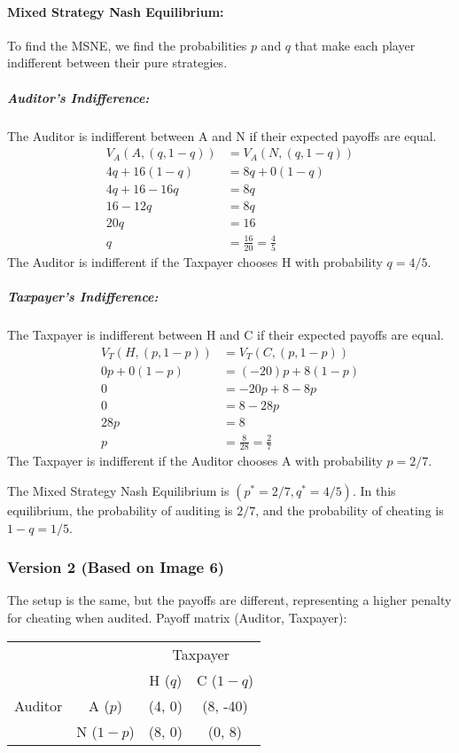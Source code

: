 \documentclass{article}
\begin{document}
\paragraph{Mixed Strategy Nash Equilibrium:}
To find the MSNE, we find the probabilities $p$ and $q$ that make each player indifferent between their pure strategies.

\subparagraph{Auditor's Indifference:} The Auditor is indifferent between A and N if their expected payoffs are equal.
\begin{align*} V_A(A, (q, 1-q)) &= V_A(N, (q, 1-q)) \\ 4q + 16(1-q) &= 8q + 0(1-q) \\ 4q + 16 - 16q &= 8q \\ 16 - 12q &= 8q \\ 20q &= 16 \\ q &= \frac{16}{20} = \frac{4}{5} \end{align*}
The Auditor is indifferent if the Taxpayer chooses H with probability $q=4/5$.

\subparagraph{Taxpayer's Indifference:} The Taxpayer is indifferent between H and C if their expected payoffs are equal.
\begin{align*} V_T(H, (p, 1-p)) &= V_T(C, (p, 1-p)) \\ 0p + 0(1-p) &= (-20)p + 8(1-p) \\ 0 &= -20p + 8 - 8p \\ 0 &= 8 - 28p \\ 28p &= 8 \\ p &= \frac{8}{28} = \frac{2}{7} \end{align*}
The Taxpayer is indifferent if the Auditor chooses A with probability $p=2/7$.

The Mixed Strategy Nash Equilibrium is $(p^* = 2/7, q^* = 4/5)$.
In this equilibrium, the probability of auditing is $2/7$, and the probability of cheating is $1-q = 1/5$.

\subsubsection{Version 2 (Based on Image 6)}
The setup is the same, but the payoffs are different, representing a higher penalty for cheating when audited.
Payoff matrix (Auditor, Taxpayer):
\begin{center}
\begin{tabular}{cc|c|c|}
  & \multicolumn{1}{c}{} & \multicolumn{2}{c}{Taxpayer} \\
  & \multicolumn{1}{c}{} & \multicolumn{1}{c}{H ($q$)} & \multicolumn{1}{c}{C ($1-q$)} \\ \cline{3-4}
  Auditor & A ($p$) & (4, 0) & (8, -40) \\ \cline{3-4}
  & N ($1-p$) & (8, 0) & (0, 8) \\ \cline{3-4}
\end{tabular}
\end{center}
\end{document}
